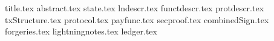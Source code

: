\documentclass[11pt]{llncs}
\begin{document}
\pagestyle{plain}
{title.tex}
{abstract.tex}
{state.tex}
{lndescr.tex}
{functdescr.tex}
{protdescr.tex}
{txStructure.tex}
{protocol.tex}
{payfunc.tex}
{secproof.tex}
{combinedSign.tex}
{forgeries.tex}
{lightningnotes.tex}
{ledger.tex}


\end{document}
